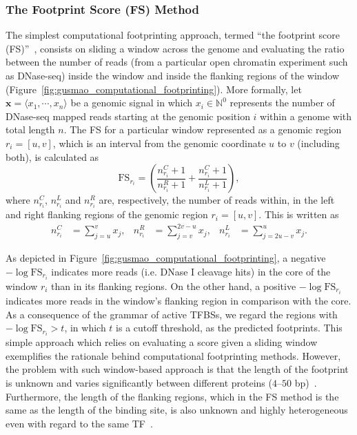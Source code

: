 \subsubsection{The Footprint Score (FS) Method}

The simplest computational footprinting approach, termed ``the footprint score (FS)''~\citep{neph2012a}, consists on sliding a window across the genome and evaluating the ratio between the number of reads (from a particular open chromatin experiment such as DNase-seq) inside the window and inside the flanking regions of the window (Figure~\ref{fig:gusmao_computational_footprinting}). More formally, let $\mathbf{x} = \langle x_1, \cdots, x_n \rangle$ be a genomic signal in which $x_i \in {\mathbb{N}}^{0}$ represents the number of DNase-seq mapped reads starting at the genomic position $i$ within a genome with total length $n$. The FS for a particular window represented as a genomic region $r_i = [u, v]$, which is an interval from the genomic coordinate $u$ to $v$ (including both), is calculated as
\begin{equation}
  \label{eq:fs1}
  \text{FS}_{r_i} = \left(\frac{{n}^{C}_{r_i}+1}{{n}^{R}_{r_i}+1} + \frac{{n}^{C}_{r_i}+1}{{n}^{L}_{r_i}+1}\right),
\end{equation}
where ${n}^{C}_{r_i}$, ${n}^{L}_{r_i}$ and ${n}^{R}_{r_i}$ are, respectively, the number of reads within, in the left and right flanking regions of the genomic region $r_i = [u, v]$. This is written as
\begin{align}
  \label{eq:fs2}
  {n}^{C}_{r_i} &= \sum_{j=u}^{v} {x}_{j}, &
  {n}^{R}_{r_i} &= \sum_{j=v}^{2v-u} {x}_{j}, &
  {n}^{L}_{r_i} &= \sum_{j=2u-v}^{u} {x}_{j}.
\end{align}

As depicted in Figure~\ref{fig:gusmao_computational_footprinting}, a negative $-\log \text{FS}_{r_i}$ indicates more reads (i.e. DNase I cleavage hits) in the core of the window $r_i$ than in its flanking regions. On the other hand, a positive $-\log \text{FS}_{r_i}$ indicates more reads in the window's flanking region in comparison with the core. As a consequence of the grammar of active TFBSs, we regard the regions with $-\log \text{FS}_{r_i} > t$, in which $t$ is a cutoff threshold, as the predicted footprints. This simple approach which relies on evaluating a score given a sliding window exemplifies the rationale behind computational footprinting methods. However, the problem with such window-based approach is that the length of the footprint is unknown and varies significantly between different proteins ($4$--$50$ bp)~\citep{neph2012a}. Furthermore, the length of the flanking regions, which in the FS method is the same as the length of the binding site, is also unknown and highly heterogeneous even with regard to the same TF~\citep{sung2014}.

